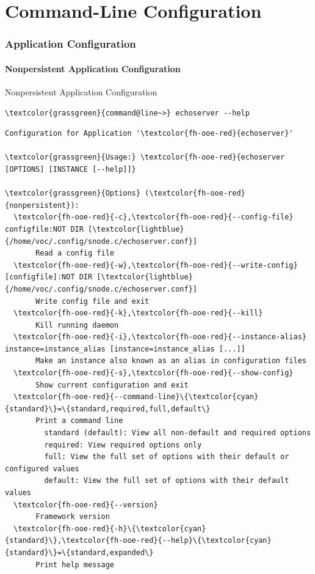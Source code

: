 \nopartpage
\part{Command-Line Configuration}
\withpartpage
\withsectionpage
\section{Application Configuration}
\nosectionpage
\subsection{Nonpersistent Application Configuration}

\begin{frame}[fragile]{Nonpersistent Application Configuration}
\begin{scriptsize}
\begin{Verbatim}[commandchars=\\\{\}]
\textcolor{grassgreen}{command@line~>} echoserver --help
\end{Verbatim}
\begin{Verbatim}[commandchars=\\\{\},frame=leftline]
Configuration for Application '\textcolor{fh-ooe-red}{echoserver}'

\textcolor{grassgreen}{Usage:} \textcolor{fh-ooe-red}{echoserver [OPTIONS] [INSTANCE [--help]]}

\textcolor{grassgreen}{Options} (\textcolor{fh-ooe-red}{nonpersistent}):
  \textcolor{fh-ooe-red}{-c},\textcolor{fh-ooe-red}{--config-file} configfile:NOT DIR [\textcolor{lightblue}{/home/voc/.config/snode.c/echoserver.conf}]
       Read a config file
  \textcolor{fh-ooe-red}{-w},\textcolor{fh-ooe-red}{--write-config} [configfile]:NOT DIR [\textcolor{lightblue}{/home/voc/.config/snode.c/echoserver.conf}]
       Write config file and exit
  \textcolor{fh-ooe-red}{-k},\textcolor{fh-ooe-red}{--kill}
       Kill running daemon
  \textcolor{fh-ooe-red}{-i},\textcolor{fh-ooe-red}{--instance-alias} instance=instance_alias [instance=instance_alias [...]]
       Make an instance also known as an alias in configuration files
  \textcolor{fh-ooe-red}{-s},\textcolor{fh-ooe-red}{--show-config}
       Show current configuration and exit
  \textcolor{fh-ooe-red}{--command-line}\{\textcolor{cyan}{standard}\}=\{standard,required,full,default\}
       Print a command line
         standard (default): View all non-default and required options
         required: View required options only
         full: View the full set of options with their default or configured values
         default: View the full set of options with their default values
  \textcolor{fh-ooe-red}{--version}
       Framework version
  \textcolor{fh-ooe-red}{-h}\{\textcolor{cyan}{standard}\},\textcolor{fh-ooe-red}{--help}\{\textcolor{cyan}{standard}\}=\{standard,expanded\}
       Print help message
\end{Verbatim}
\end{scriptsize}
\end{frame}
